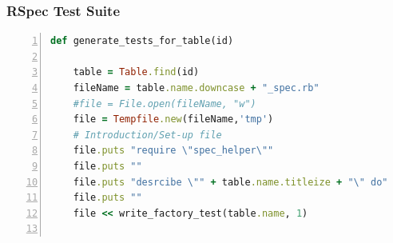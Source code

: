 \documentclass[a4paper,12pt]{article}
\begin{document}
\subsubsection{RSpec Test Suite}


\begin{lstlisting}[frame=single,numbers=left,language = ruby,caption= {generate\_tests\_for\_table}, label={code:bigboy}]
def generate_tests_for_table(id)

    table = Table.find(id)
    fileName = table.name.downcase + "_spec.rb"
    #file = File.open(fileName, "w")
    file = Tempfile.new(fileName,'tmp')
    # Introduction/Set-up file
    file.puts "require \"spec_helper\""
    file.puts ""
    file.puts "desrcibe \"" + table.name.titleize + "\" do"
    file.puts ""
    file << write_factory_test(table.name, 1)


\end{lstlisting}
\end{document}
